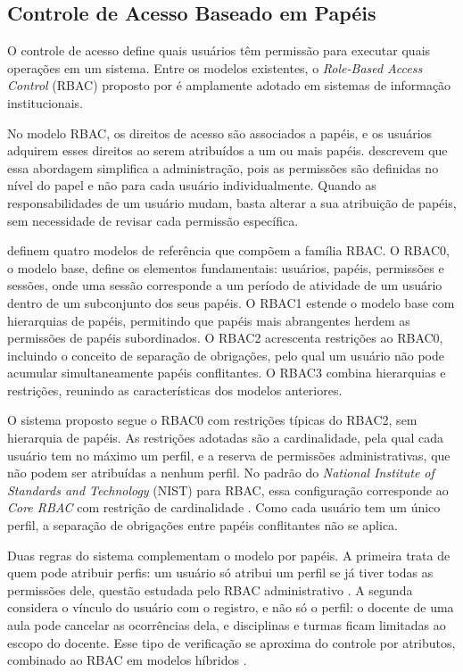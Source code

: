 \subsection{Controle de Acesso Baseado em Papéis}
\label{sec:rbac}

O controle de acesso define quais usuários têm permissão para executar quais operações em um sistema. Entre os modelos existentes, o \textit{Role-Based Access Control} (RBAC) proposto por  é amplamente adotado em sistemas de informação institucionais.

No modelo RBAC, os direitos de acesso são associados a papéis, e os usuários adquirem esses direitos ao serem atribuídos a um ou mais papéis.  descrevem que essa abordagem simplifica a administração, pois as permissões são definidas no nível do papel e não para cada usuário individualmente. Quando as responsabilidades de um usuário mudam, basta alterar a sua atribuição de papéis, sem necessidade de revisar cada permissão específica.

 definem quatro modelos de referência que compõem a família RBAC. O RBAC0, o modelo base, define os elementos fundamentais: usuários, papéis, permissões e sessões, onde uma sessão corresponde a um período de atividade de um usuário dentro de um subconjunto dos seus papéis. O RBAC1 estende o modelo base com hierarquias de papéis, permitindo que papéis mais abrangentes herdem as permissões de papéis subordinados. O RBAC2 acrescenta restrições ao RBAC0, incluindo o conceito de separação de obrigações, pelo qual um usuário não pode acumular simultaneamente papéis conflitantes. O RBAC3 combina hierarquias e restrições, reunindo as características dos modelos anteriores.

O sistema proposto segue o RBAC0 com restrições típicas do RBAC2, sem hierarquia de papéis. As restrições adotadas são a cardinalidade, pela qual cada usuário tem no máximo um perfil, e a reserva de permissões administrativas, que não podem ser atribuídas a nenhum perfil. No padrão do \textit{National Institute of Standards and Technology} (NIST) para RBAC, essa configuração corresponde ao \textit{Core RBAC} com restrição de cardinalidade \cite{ferraiolo2001nist}. Como cada usuário tem um único perfil, a separação de obrigações entre papéis conflitantes não se aplica.

Duas regras do sistema complementam o modelo por papéis. A primeira trata de quem pode atribuir perfis: um usuário só atribui um perfil se já tiver todas as permissões dele, questão estudada pelo RBAC administrativo \cite{sandhu1999arbac97}. A segunda considera o vínculo do usuário com o registro, e não só o perfil: o docente de uma aula pode cancelar as ocorrências dela, e disciplinas e turmas ficam limitadas ao escopo do docente. Esse tipo de verificação se aproxima do controle por atributos, combinado ao RBAC em modelos híbridos \cite{kuhn2010attributes}.

